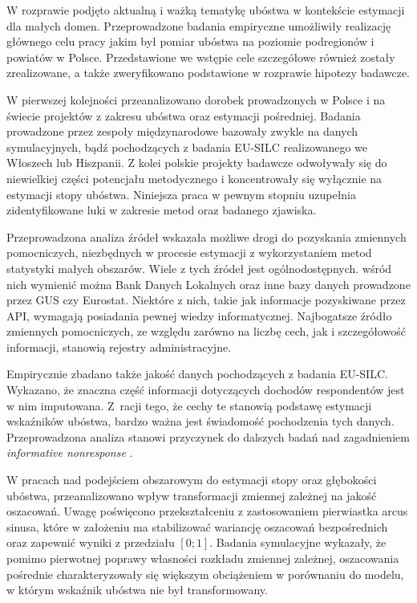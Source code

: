W rozprawie podjęto aktualną i ważką tematykę ubóstwa w kontekście estymacji dla małych domen. Przeprowadzone badania empiryczne umożliwiły realizację głównego celu pracy jakim był pomiar ubóstwa na poziomie podregionów i powiatów w Polsce. Przedstawione we wstępie cele szczegółowe również zostały zrealizowane, a także zweryfikowano podstawione w rozprawie hipotezy badawcze. 

W pierwszej kolejności przeanalizowano dorobek prowadzonych w Polsce i na świecie projektów z zakresu ubóstwa oraz estymacji pośredniej. Badania prowadzone przez zespoły międzynarodowe bazowały zwykle na danych symulacyjnych, bądź pochodzących z badania EU-SILC realizowanego we Włoszech lub Hiszpanii. Z kolei polskie projekty badawcze odwoływały się do niewielkiej części potencjału metodycznego i koncentrowały się wyłącznie na estymacji stopy ubóstwa. Niniejsza praca w pewnym stopniu uzupełnia zidentyfikowane luki w zakresie metod oraz badanego zjawiska.

Przeprowadzona analiza źródeł wskazała możliwe drogi do pozyskania zmiennych pomocniczych, niezbędnych w procesie estymacji z wykorzystaniem metod statystyki małych obszarów. Wiele z tych źródeł jest ogólnodostępnych. wśród nich wymienić można Bank Danych Lokalnych oraz inne bazy danych prowadzone przez GUS czy Eurostat. Niektóre z nich, takie jak informacje pozyskiwane przez API, wymagają posiadania pewnej wiedzy informatycznej. Najbogatsze źródło zmiennych pomocniczych, ze względu zarówno na liczbę cech, jak i szczegółowość informacji, stanowią rejestry administracyjne. %

Empirycznie zbadano także jakość danych pochodzących z badania EU-SILC. Wykazano, że znaczna część informacji dotyczących dochodów respondentów jest w nim imputowana. Z~racji tego, że cechy te stanowią podstawę estymacji wskaźników ubóstwa, bardzo ważna jest świadomość pochodzenia tych danych. Przeprowadzona analiza stanowi przyczynek do dalszych badań nad zagadnieniem \textit{informative nonresponse} \citep{laaksonen2006}.

W pracach nad podejściem obszarowym do estymacji stopy oraz głębokości ubóstwa, przeanalizowano wpływ transformacji zmiennej zależnej na jakość oszacowań. Uwagę poświęcono przekształceniu z zastosowaniem pierwiastka arcus sinusa, które w założeniu ma stabilizować wariancję oszacowań bezpośrednich oraz zapewnić wyniki z przedziału $[0;1]$. Badania symulacyjne wykazały, że pomimo pierwotnej poprawy własności rozkładu zmiennej zależnej, oszacowania pośrednie charakteryzowały się większym obciążeniem w porównaniu do modelu, w którym wskaźnik ubóstwa nie był transformowany.

